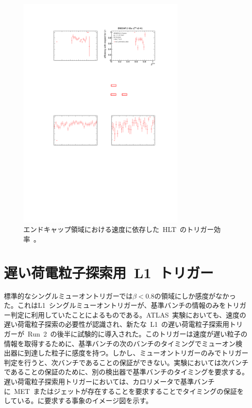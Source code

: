 \begin{figure}[tbp]
        \centering   
        \includegraphics[width=0.75\textwidth,page=1]{img/pdf3/hlt.pdf}
        \caption[エンドキャップ領域における速度に依存した HLT のトリガー効率]{エンドキャップ領域における速度に依存した~HLT~のトリガー効率~\cite{MT:01}。}
        \label{fig:hlt}
\end{figure}

\section{遅い荷電粒子探索用~L1~トリガー}
\label{sec:latemu}
標準的なシングルミューオントリガーでは$\beta<0.8$の領域にしか感度がなかった。これはL1~シングルミューオントリガーが、基準バンチの情報のみをトリガー判定に利用していたことによるものである。ATLAS~実験においても、速度の遅い荷電粒子探索の必要性が認識され、新たな~L1~の遅い荷電粒子探索用トリガーが~Run~2~の後半に試験的に導入された。このトリガーは速度が遅い粒子の情報を取得するために、基準バンチの次のバンチのタイミングでミューオン検出器に到達した粒子に感度を持つ。しかし、ミューオントリガーのみでトリガー判定を行うと、次バンチであることの保証ができない。実験においては次バンチであることの保証のために、別の検出器で基準バンチのタイミングを要求する。遅い荷電粒子探索用トリガーにおいては、カロリメータで基準バンチに~MET~またはジェットが存在することを要求することでタイミングの保証をしている。に要求する事象のイメージ図を示す。

